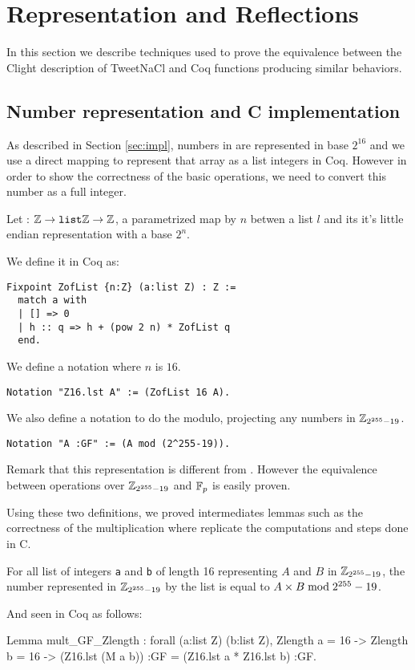 \section{Representation and Reflections}

In this section we describe techniques used to prove the equivalence between the
Clight description of TweetNaCl and Coq functions producing similar behaviors.

\subsection{Number representation and C implementation}

As described in Section \ref{sec:impl}, numbers in  are represented
in base $2^{16}$ and we use a direct mapping to represent that array as a list
integers in Coq. However in order to show the correctness of the basic operations,
we need to convert this number as a full integer.
\begin{definition}
Let  : $\mathbb{Z} \rightarrow \texttt{list} \mathbb{Z} \rightarrow \mathbb{Z}$, a parametrized map by $n$ betwen a list $l$ and its
it's little endian representation with a base $2^n$.
\end{definition}
We define it in Coq as:
\begin{lstlisting}[language=Coq]
Fixpoint ZofList {n:Z} (a:list Z) : Z :=
  match a with
  | [] => 0
  | h :: q => h + (pow 2 n) * ZofList q
  end.
\end{lstlisting}
We define a notation where $n$ is $16$.
\begin{lstlisting}[language=Coq]
Notation "Z16.lst A" := (ZofList 16 A).
\end{lstlisting}
We also define a notation to do the modulo, projecting any numbers in $\mathbb{Z}_{2^{255}-19}$.
\begin{lstlisting}[language=Coq]
Notation "A :GF" := (A mod (2^255-19)).
\end{lstlisting}
Remark that this representation is different from .
However the equivalence between operations over $\mathbb{Z}_{2^{255}-19}$ and $\mathbb{F}_{p}$ is easily proven.

Using these two definitions, we proved intermediates lemmas such as the correctness of the
multiplication  where  replicate the computations and steps done in C.
\begin{lemma}
For all list of integers \texttt{a} and \texttt{b} of length 16 representing
$A$ and $B$ in $\mathbb{Z}_{2^{255}-19}$, the number represented in $\mathbb{Z}_{2^{255}-19}$ by the list 
is equal to $A \times B \bmod 2^{255}-19$.
\end{lemma}
And seen in Coq as follows:
\begin{Coq}
Lemma mult_GF_Zlength :
  forall (a:list Z) (b:list Z),
  Zlength a = 16 ->
  Zlength b = 16 ->
   (Z16.lst (M a b)) :GF =
   (Z16.lst a * Z16.lst b) :GF.
\end{Coq}


